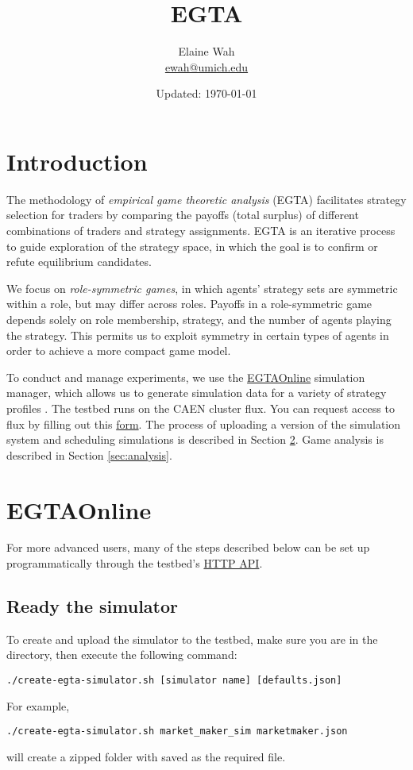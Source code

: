 \documentclass[11pt]{article}
\begin{document}
	
\title{EGTA}
\author{
  Elaine Wah \\
  \href{mailto:ewah@umich.edu}{ewah@umich.edu}
}
\date{Updated: \today}
\maketitle

\section{Introduction}

The methodology of \emph{empirical game theoretic analysis} (EGTA) \citep{Wellman2006} facilitates strategy selection for traders by comparing the payoffs (total surplus) of different combinations of traders and strategy assignments. EGTA is an iterative process to guide exploration of the strategy space, in which the goal is to confirm or refute equilibrium candidates.

We focus on \emph{role-symmetric games}, in which agents' strategy sets are symmetric within a role, but may differ across roles.
Payoffs in a role-symmetric game depends solely on role membership, strategy, and the number of agents playing the strategy. This permits us to exploit symmetry in certain types of agents in order to achieve a more compact game model.

To conduct and manage experiments, we use the \href{http://egtaonline.eecs.umich.edu}{EGTAOnline} simulation manager, which allows us to generate simulation data for a variety of strategy profiles \citep{Cassell2013}.
The testbed runs on the CAEN cluster flux. You can request access to flux by filling out this \href{https://docs.google.com/a/umich.edu/forms/d/1u9hdqdinnNC9iF6If2xV0C06knbP_TKJBIzfCSnWw6I/viewform}{form}.
The process of uploading a version of the simulation system and scheduling simulations is described in Section \ref{sec:egta}.
Game analysis is described in Section \ref{sec:analysis}.

\section{EGTAOnline}\label{sec:egta}

For more advanced users, many of the steps described below can be set up programmatically through the testbed's \href{https://github.com/bcassell/egtaonline3/wiki/API}{HTTP API}.

\subsection{Ready the simulator}
To create and upload the simulator to the testbed, make sure you are in the  directory, then execute the following command:
\begin{verbatim}
./create-egta-simulator.sh [simulator name] [defaults.json]
\end{verbatim}
For example, 
\begin{verbatim}
./create-egta-simulator.sh market_maker_sim marketmaker.json
\end{verbatim}
will create a zipped folder  with  saved as the required  file. 
\end{document}
